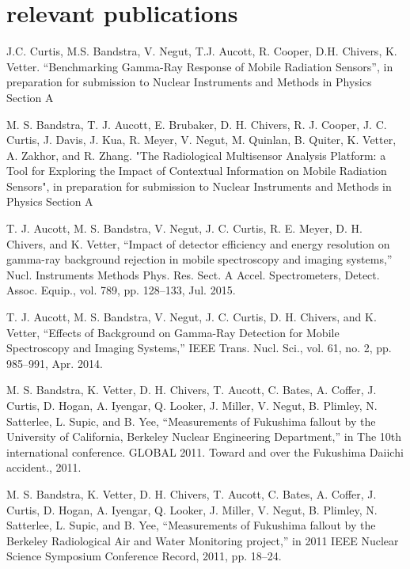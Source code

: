 \documentclass[print]{resume} %
\begin{document}
\section{relevant publications}

J.C. Curtis, M.S. Bandstra, V. Negut, T.J. Aucott, R. Cooper, D.H. Chivers, K. Vetter. “Benchmarking Gamma-Ray Response of Mobile Radiation Sensors”, in preparation for submission to Nuclear Instruments and Methods in Physics Section A\vspace{3mm}

M. S. Bandstra, T. J. Aucott, E. Brubaker, D. H. Chivers, R. J. Cooper, J. C. Curtis, J. Davis, J. Kua, R. Meyer, V. Negut, M. Quinlan, B. Quiter, K. Vetter, A. Zakhor, and R. Zhang. "The Radiological Multisensor Analysis Platform: a Tool for Exploring the Impact of Contextual Information on Mobile Radiation Sensors", in preparation for submission to Nuclear Instruments and Methods in Physics Section A\vspace{3mm}

T. J. Aucott, M. S. Bandstra, V. Negut, J. C. Curtis, R. E. Meyer, D. H. Chivers, and K. Vetter, “Impact of detector efficiency and energy resolution on gamma-ray background rejection in mobile spectroscopy and imaging systems,” Nucl. Instruments Methods Phys. Res. Sect. A Accel. Spectrometers, Detect. Assoc. Equip., vol. 789, pp. 128–133, Jul. 2015.\vspace{3mm}

T. J. Aucott, M. S. Bandstra, V. Negut, J. C. Curtis, D. H. Chivers, and K. Vetter, “Effects of Background on Gamma-Ray Detection for Mobile Spectroscopy and Imaging Systems,” IEEE Trans. Nucl. Sci., vol. 61, no. 2, pp. 985–991, Apr. 2014.\vspace{3mm}

M. S. Bandstra, K. Vetter, D. H. Chivers, T. Aucott, C. Bates, A. Coffer, J. Curtis, D. Hogan, A. Iyengar, Q. Looker, J. Miller, V. Negut, B. Plimley, N. Satterlee, L. Supic, and B. Yee, “Measurements of Fukushima fallout by the University of California, Berkeley Nuclear Engineering Department,” in The 10th international conference. GLOBAL 2011. Toward and over the Fukushima Daiichi accident., 2011.\vspace{3mm}

M. S. Bandstra, K. Vetter, D. H. Chivers, T. Aucott, C. Bates, A. Coffer, J. Curtis, D. Hogan, A. Iyengar, Q. Looker, J. Miller, V. Negut, B. Plimley, N. Satterlee, L. Supic, and B. Yee, “Measurements of Fukushima fallout by the Berkeley Radiological Air and Water Monitoring project,” in 2011 IEEE Nuclear Science Symposium Conference Record, 2011, pp. 18–24.

%

\end{document}
